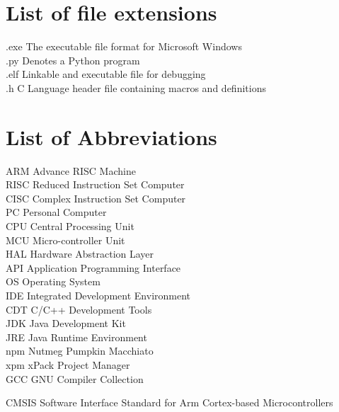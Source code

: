 \listoffigures
\newpage\cleardoublepage

\listoftables


\chapter*{List of file extensions}
\label{listExt}
.exe \Dotfill The executable file format for Microsoft Windows
\\
.py \Dotfill Denotes a Python program
\\
.elf \Dotfill Linkable and executable file for debugging 
\\
.h \Dotfill C Language header file containing macros and definitions
\\

\newpage\cleardoublepage

\chapter*{List of Abbreviations}
\label{listAbr}
ARM \Dotfill Advance RISC Machine
\\
RISC \Dotfill Reduced Instruction Set Computer 
\\
CISC \Dotfill Complex Instruction Set Computer 
\\
PC \Dotfill Personal Computer
\\
CPU \Dotfill Central Processing Unit
\\
MCU \Dotfill Micro-controller Unit
\\
HAL \Dotfill Hardware Abstraction Layer
\\
API \Dotfill Application Programming Interface
\\
OS \Dotfill Operating System
\\
IDE \Dotfill Integrated Development Environment 
\\
CDT \Dotfill C/C++ Development Tools
\\
JDK \Dotfill Java Development Kit 
\\
JRE \Dotfill Java Runtime Environment
\\
npm \Dotfill Nutmeg Pumpkin Macchiato 
\\
xpm \Dotfill xPack Project Manager
\\
GCC \Dotfill GNU Compiler Collection

CMSIS \Dotfill Software Interface Standard for Arm Cortex-based Microcontrollers



\newpage\cleardoublepage